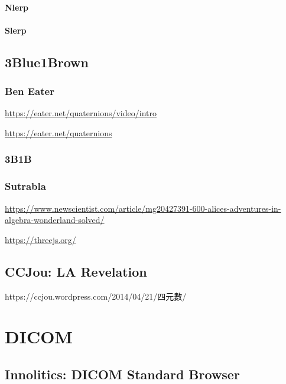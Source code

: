 \documentclass[
]{book}
\theoremstyle{definition}
\theoremstyle{definition}
\theoremstyle{definition}
\theoremstyle{definition}
\theoremstyle{remark}
\begin{document}
\subsubsection{Nlerp}\label{nlerp}

\subsubsection{Slerp}\label{slerp}

\section{3Blue1Brown}\label{blue1brown}

\subsection{Ben Eater}\label{ben-eater}

\url{https://eater.net/quaternions/video/intro}

\url{https://eater.net/quaternions}

\subsection{3B1B}\label{b1b}

\subsection{Sutrabla}\label{sutrabla}

\url{https://www.newscientist.com/article/mg20427391-600-alices-adventures-in-algebra-wonderland-solved/}

\url{https://threejs.org/}

\section{CCJou: LA Revelation}\label{ccjou-la-revelation}

\begin{CJK}{UTF8}{bsmi}
https://ccjou.wordpress.com/2014/04/21/四元數/
\end{CJK}

\chapter{DICOM}\label{dicom}

\section{Innolitics: DICOM Standard Browser}\label{innolitics-dicom-standard-browser}
\end{document}
